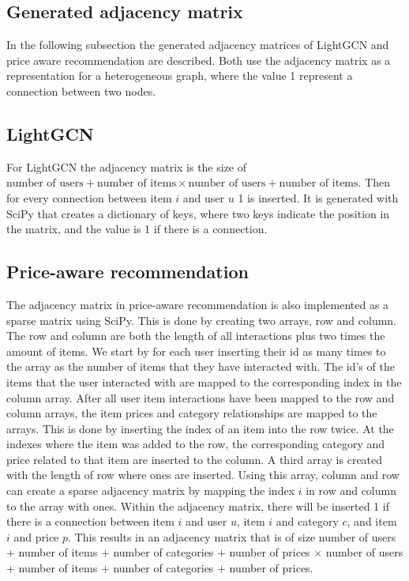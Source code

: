 \subsection{Generated adjacency matrix}
In the following subsection the generated adjacency matrices of LightGCN and price aware recommendation are described.
Both use the adjacency matrix as a representation for a heterogeneous graph, where the value 1 represent a connection between two nodes.

\subsection{LightGCN}
For LightGCN the adjacency matrix is the size of $\textrm{number of users} + \textrm{number of items} \times \textrm{number of users} + \textrm{number of items}$.
Then for every connection between item $i$ and user $u$ 1 is inserted.
It is generated with SciPy that creates a dictionary of keys, where two keys indicate the position in the matrix, and the value is 1 if there is a connection.

\subsection{Price-aware recommendation}
The adjacency matrix in price-aware recommendation is also implemented as a sparse matrix using SciPy.
This is done by creating two arrays, row and column.
The row and column are both the length of all interactions plus two times the amount of items.
We start by for each user inserting their id as many times to the array as the number of items that they have interacted with.
The id's of the items that the user interacted with are mapped to the corresponding index in the column array.
After all user item interactions have been mapped to the row and column arrays, the item prices and category relationships are mapped to the arrays.
This is done by inserting the index of an item into the row twice.
At the indexes where the item was added to the row, the corresponding category and price related to that item are inserted to the column.
A third array is created with the length of row where ones are inserted.
Using this array, column and row can create a sparse adjacency matrix by mapping the index $i$ in row and column to the array with ones.
Within the adjacency matrix, there will be inserted 1 if there is a connection between item $i$ and user $u$, item $i$ and category $c$, and item $i$ and price $p$.
This results in an adjacency matrix that is of size number of users + number of items + number of categories + number of prices $\times$ number of users + number of items + number of categories + number of prices.
